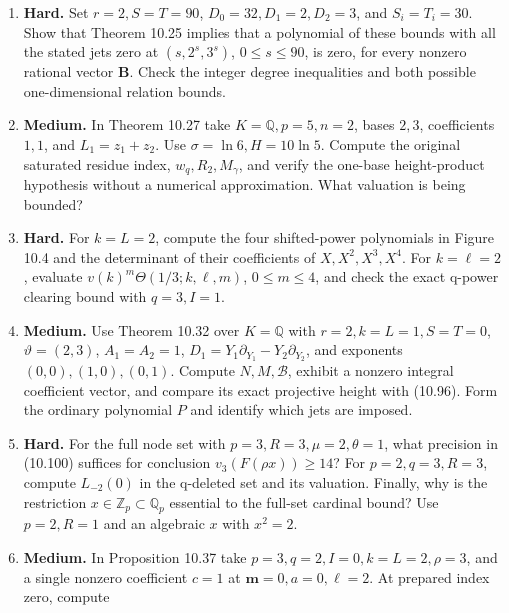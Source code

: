 \documentclass[
  11pt,
  a4paper,
]{article}
\begin{document}
\begin{enumerate}
  \textbf{Medium.} At p=5 take \(L_1=5z_1+z_3\), \(L_2=5z_2+z_3\),
  \(L_3=-5z_1-5z_2-z_3+z_4\), and \(L=L_1+L_2+L_3=z_3+z_4\). Compute the
  matrix in Lemma 10.23 and all its two-column upper minors. Choose a
  minimum-valuation derivative basis. Explain the denominator introduced
  by the other natural basis.
\item
  \textbf{Hard.} Set \(r=2,S=T=90\), \(D_0=32,D_1=2,D_2=3\), and
  \(S_i=T_i=30\). Show that Theorem 10.25 implies that a polynomial of
  these bounds with all the stated jets zero at \((s,2^s,3^s)\),
  \(0\le s\le90\), is zero, for every nonzero rational vector
  \(\boldsymbol B\). Check the integer degree inequalities and both
  possible one-dimensional relation bounds.
\item
  \textbf{Medium.} In Theorem 10.27 take \(K=\mathbb Q,p=5,n=2\), bases
  \(2,3\), coefficients \(1,1\), and \(L_1=z_1+z_2\). Use
  \(\sigma=\ln6,H=10\ln5\). Compute the original saturated residue
  index, \(w_q,R_2,M_\gamma\), and verify the one-base height-product
  hypothesis without a numerical approximation. What valuation is being
  bounded?
\item
  \textbf{Hard.} For \(k=L=2\), compute the four shifted-power
  polynomials in Figure 10.4 and the determinant of their coefficients
  of \(X,X^2,X^3,X^4\). For \(k=\ell=2\), evaluate
  \(v(k)^m\Theta(1/3;k,\ell,m)\), \(0\le m\le4\), and check the exact
  q-power clearing bound with \(q=3,I=1\).
\item
  \textbf{Medium.} Use Theorem 10.32 over \(K=\mathbb Q\) with
  \(r=2,k=L=1,S=T=0\), \(\vartheta=(2,3)\), \(A_1=A_2=1\),
  \(D_1=Y_1\partial_{Y_1}-Y_2\partial_{Y_2}\), and exponents
  \((0,0),(1,0),(0,1)\). Compute \(N,M,\mathcal B\), exhibit a nonzero
  integral coefficient vector, and compare its exact projective height
  with (10.96). Form the ordinary polynomial \(P\) and identify which
  jets are imposed.
\item
  \textbf{Hard.} For the full node set with \(p=3,R=3,\mu=2,\theta=1\),
  what precision in (10.100) suffices for conclusion
  \(v_3(F(\rho x))\ge14\)? For \(p=2,q=3,R=3\), compute \(L_{-2}(0)\) in
  the q-deleted set and its valuation. Finally, why is the restriction
  \(x\in\mathbb Z_p\subset\mathbb Q_p\) essential to the full-set
  cardinal bound? Use \(p=2,R=1\) and an algebraic \(x\) with \(x^2=2\).
\item
  \textbf{Medium.} In Proposition 10.37 take
  \(p=3,q=2,I=0,k=L=2,\rho=3\), and a single nonzero coefficient \(c=1\)
  at \(\boldsymbol m=0,a=0,\ell=2\). At prepared index zero, compute

\end{enumerate}
\end{document}
